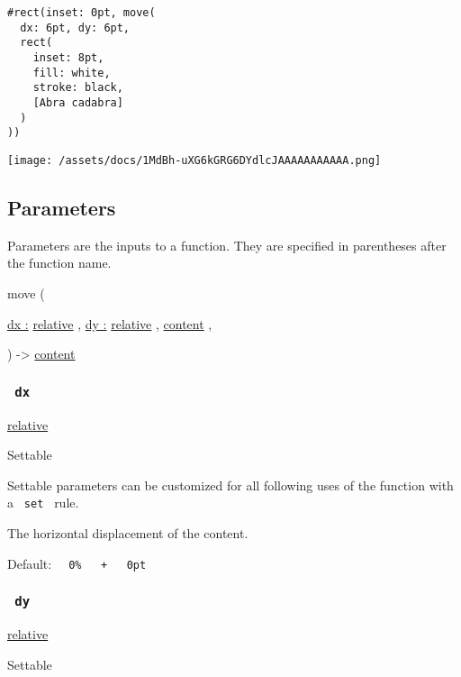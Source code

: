 \begin{verbatim}
#rect(inset: 0pt, move(
  dx: 6pt, dy: 6pt,
  rect(
    inset: 8pt,
    fill: white,
    stroke: black,
    [Abra cadabra]
  )
))
\end{verbatim}

\texttt{[image: /assets/docs/1MdBh-uXG6kGRG6DYdlcJAAAAAAAAAAA.png]}

\subsection{\texorpdfstring{{ Parameters
}}{ Parameters }}\label{parameters}

\label{parameters-tooltip}
Parameters are the inputs to a function. They are specified in
parentheses after the function name.

{ move } (

{ \hyperref[parameters-dx]{dx :}
\href{/docs/reference/layout/relative/}{relative} , } {
\hyperref[parameters-dy]{dy :}
\href{/docs/reference/layout/relative/}{relative} , } {
\href{/docs/reference/foundations/content/}{content} , }

) -\textgreater{} \href{/docs/reference/foundations/content/}{content}

\subsubsection{\texorpdfstring{\texttt{\ dx\ }}{ dx }}\label{parameters-dx}

\href{/docs/reference/layout/relative/}{relative}

{{ Settable }}

\label{parameters-dx-settable-tooltip}
Settable parameters can be customized for all following uses of the
function with a \texttt{\ set\ } rule.

The horizontal displacement of the content.

Default:
\texttt{\ }{\texttt{\ 0\%\ }}\texttt{\ }{\texttt{\ +\ }}\texttt{\ }{\texttt{\ 0pt\ }}\texttt{\ }

\subsubsection{\texorpdfstring{\texttt{\ dy\ }}{ dy }}\label{parameters-dy}

\href{/docs/reference/layout/relative/}{relative}

{{ Settable }}

